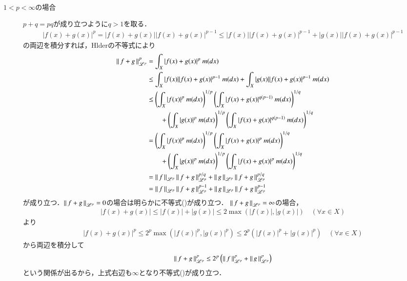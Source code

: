 \begin{qst}
\begin{prf}
\begin{description}
		\item[$1 < p < \infty$の場合]
			$p + q = pq$が成り立つように$q > 1$を取る．
			\begin{align}
				|f(x) + g(x)|^p = |f(x) + g(x)||f(x) + g(x)|^{p-1} \leq |f(x)||f(x) + g(x)|^{p-1} + |g(x)||f(x) + g(x)|^{p-1}
			\end{align}
			の両辺を積分すれば，Hlderの不等式により
			\begin{align}
				\left\|\, f+g\, \right\|_{\mathscr{L}^p}^p &= \int_{X} |f(x) + g(x)|^p\ m(dx) \\
				&\leq \int_{X} |f(x)||f(x) + g(x)|^{p-1}\ m(dx) + \int_{X} |g(x)||f(x) + g(x)|^{p-1}\ m(dx) \\
				&\leq \left( \int_{X} |f(x)|^p\ m(dx) \right)^{1/p} \left( \int_{X} |f(x) + g(x)|^{q(p-1)}\ m(dx) \right)^{1/q} \\
					&\qquad + \left( \int_{X} |g(x)|^p\ m(dx) \right)^{1/p} \left( \int_{X} |f(x) + g(x)|^{q(p-1)}\ m(dx) \right)^{1/q} \\
				&= \left( \int_{X} |f(x)|^p\ m(dx) \right)^{1/p} \left( \int_{X} |f(x) + g(x)|^p\ m(dx) \right)^{1/q} \\
					&\qquad + \left( \int_{X} |g(x)|^p\ m(dx) \right)^{1/p} \left( \int_{X} |f(x) + g(x)|^p\ m(dx) \right)^{1/q} \\
				&= \left\|\, f\, \right\|_{\mathscr{L}^p}\left\|\, f+g\, \right\|_{\mathscr{L}^p}^{p/q} + \left\|\, g\, \right\|_{\mathscr{L}^p}\left\|\, f+g\, \right\|_{\mathscr{L}^p}^{p/q} \\
				&= \left\|\, f\, \right\|_{\mathscr{L}^p}\left\|\, f+g\, \right\|_{\mathscr{L}^p}^{p-1} + \left\|\, g\, \right\|_{\mathscr{L}^p}\left\|\, f+g\, \right\|_{\mathscr{L}^p}^{p-1}
			\end{align}
			が成り立つ．$\left\|\, f+g\, \right\|_{\mathscr{L}^p} = 0$の場合は明らかに不等式()が成り立つ．
			$\left\|\, f+g\, \right\|_{\mathscr{L}^p} = \infty$の場合，
			\begin{align}
				|f(x) + g(x)| \leq |f(x)| + |g(x)| \leq 2 \max{}{(|f(x)|,|g(x)|)} \quad (\forall x \in X)
			\end{align}
			より
			\begin{align}
				|f(x) + g(x)|^p \leq 2^p \max{}{\left( |f(x)|^p,|g(x)|^p \right)} \leq 2^p \left( |f(x)|^p + |g(x)|^p \right) \quad (\forall x \in X)
			\end{align}
			から両辺を積分して
			\begin{align}
				\left\|\, f+g\, \right\|_{\mathscr{L}^p}^p \leq 2^p \left( \left\|\, f\, \right\|_{\mathscr{L}^p}^p + \left\|\, g\, \right\|_{\mathscr{L}^p}^p \right)
			\end{align}
			という関係が出るから，上式右辺も$\infty$となり不等式()が成り立つ．

\end{description}
\end{prf}
\end{qst}
